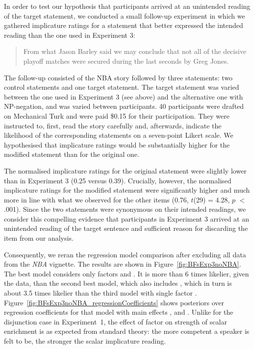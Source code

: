 \documentclass[12pt]{article}
\begin{document}
In order to test our hypothesis that participants arrived at an unintended reading of the
target statement, we conducted a small follow-up experiment in which we gathered implicature
ratings for a statement that better expressed the intended reading than the one used in
Experiment 3:

\begin{quote} From what Jason Barley said we may conclude that not all of the decisive playoff matches were secured during the last seconds by Greg Jones. \end{quote}

\noindent The follow-up consisted of the NBA story followed by three statements: two control
statements and one target statement. The target statement was varied between the one used in
Experiment 3 (see above) and the alternative one with NP-negation, and was varied between
participants. 40 participants were drafted on Mechanical Turk and were paid \$0.15 for their
participation. They were instructed to, first, read the story carefully and, afterwards,
indicate the likelihood of the corresponding statements on a seven-point Likert scale. We
hypothesised that implicature ratings would be substantially higher for the modified statement
than for the original one.

The normalised implicature ratings for the original statement were slightly lower than in
Experiment 3 (0.25 versus 0.39). Crucially, however, the normalised implicature ratings for the
modified statement were significantly higher and much more in line with what we observed for
the other items (0.76, $t$(29) = 4.28, $p$ $<$ .001). Since the two statements were synonymous
on their intended readings, we consider this compelling evidence that participants in
Experiment 3 arrived at an unintended reading of the target sentence and sufficient reason for
discarding the item from our analysis.

Consequently, we reran the regression model comparison after excluding all data from the
\emph{NBA} vignette. The results are shown in Figure~\ref{fig:BFsExp3noNBA}. The best model
considers only factors \com and \pri. It is more than 6 times likelier, given the data, than
the second best model, which also includes \rel, which in turn is about 3.5 times likelier than
the third model with single factor \pri. Figure~\ref{fig:BFsExp3noNBA_regressionCoefficients}
shows posteriors over regression coefficients for that model with main effects \rel, \com and
\pri. Unlike for the disjunction case in Experiment~1, the effect of factor \com on strength of
scalar enrichment is as expected from standard theory: the more competent a speaker is felt to
be, the stronger the scalar implicature reading.
\end{document}
